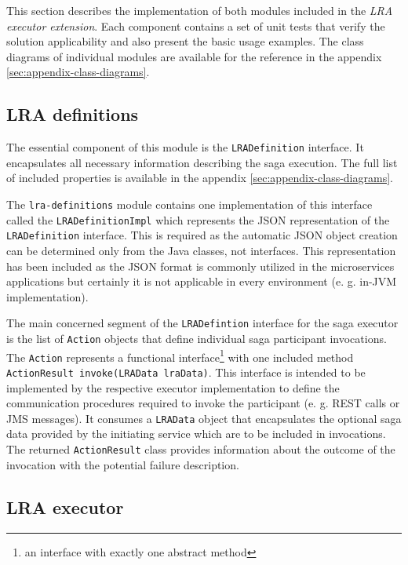 \documentclass[oneside,
  digital, %
  table,   %
  nolof,     %
  nolot,     %
]{fithesis3}
\begin{document}
This section describes the implementation of both modules included in the \textit{LRA executor extension}. Each component contains a set of unit tests that verify the solution applicability and also present the basic usage examples. The class diagrams of individual modules are available for the reference in the appendix \ref{sec:appendix-class-diagrams}.

\subsection{LRA definitions}

The essential component of this module is the \texttt{LRADefinition} interface. It encapsulates all necessary information describing the saga execution. The full list of included properties is available in the appendix \ref{sec:appendix-class-diagrams}. 

The \texttt{lra-definitions} module contains one implementation of this interface called the \texttt{LRADefinitionImpl} which represents the JSON representation of the \texttt{LRADefinition} interface. This is required as the automatic JSON object creation can be determined only from the Java classes, not interfaces. This representation has been included as the JSON format is commonly utilized in the microservices applications but certainly it is not applicable in every environment (e. g. in-JVM implementation).

The main concerned segment of the \texttt{LRADefintion} interface for the saga executor is the list of \texttt{Action} objects that define individual saga participant invocations. The \texttt{Action} represents a functional interface\footnote{an interface with exactly one abstract method} with one included method \texttt{ActionResult invoke(LRAData lraData)}. This interface is intended to be implemented by the respective executor implementation to define the communication procedures required to invoke the participant (e. g. REST calls or JMS messages). It consumes a \texttt{LRAData} object that encapsulates the optional saga data provided by the initiating service which are to be included in invocations. The returned \texttt{ActionResult} class provides information about the outcome of the invocation with the potential failure description.

\subsection{LRA executor}
\end{document}
